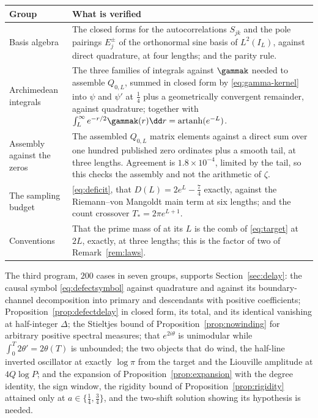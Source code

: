 \begin{center}
\begin{tabular}{@{}p{}p{}@{}}
\toprule
Group & What is verified\\
\midrule
Basis algebra &
The closed forms for the autocorrelations $S_{jk}$ and the pole pairings
$E_j^{\pm}$ of the orthonormal sine basis of $L^2(I_L)$, against direct
quadrature, at four lengths; and the parity rule.\\
Archimedean integrals &
The three families of integrals against $\gammak$ needed to assemble $Q_{0,L}$,
summed in closed form by \eqref{eq:gamma-kernel} into $\psi$ and $\psi'$ at
$\frac14$ plus a geometrically convergent remainder, against quadrature; together
with $\int_L^\infty e^{-r/2}\gammak(r)\dd r=\operatorname{artanh}(e^{-L})$.\\
Assembly against the zeros &
The assembled $Q_{0,L}$ matrix elements against a direct sum over one hundred
published zero ordinates plus a smooth tail, at three lengths. Agreement is
$1.8\times10^{-4}$, limited by the tail, so this checks the assembly and not the
arithmetic of $\zeta$.\\
The sampling budget &
\eqref{eq:deficit}, that $D(L)=2e^L-\frac74$ exactly, against the
Riemann--von Mangoldt main term at six lengths; and the count crossover
$T_*=2\pi e^{L+1}$.\\
Conventions &
That the prime mass of \cite{ZhuCompact} at its $L$ is the comb of
\eqref{eq:target} at $2L$, exactly, at three lengths; this is the factor of two
of Remark~\ref{rem:laws}.\\
\bottomrule
\end{tabular}
\end{center}

The third program, $200$ cases in seven groups, supports
Section~\ref{sec:delay}: the causal symbol \eqref{eq:defectsymbol} against
quadrature and against its boundary-channel decomposition into primary and
descendants with positive coefficients; Proposition~\ref{prop:defectdelay} in
closed form, its total, and its identical vanishing at half-integer $\Delta$; the
Stieltjes bound of Proposition~\ref{prop:nowinding} for arbitrary positive
spectral measures; that $e^{2i\theta}$ is unimodular while
$\int_0^T2\theta'=2\theta(T)$ is unbounded; the two objects that do wind, the
half-line inverted oscillator at exactly $\log\pi$ from the target and the
Liouville amplitude at $4Q\log P$; and the expansion of
Proposition~\ref{prop:expansion} with the degree identity, the sign window, the
rigidity bound of Proposition~\ref{prop:rigidity} attained only at
$a\in\{\frac14,\frac34\}$, and the two-shift solution showing its hypothesis is
needed.

